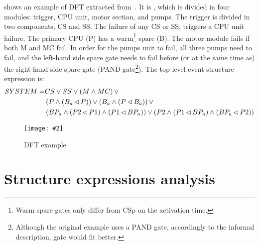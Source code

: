 \documentclass[12pt,openright,twoside,a4paper,oldfontcommands,english,brazil,draft]{abntex2}
\theoremstyle{theo}
\newcommand{\includegraphicsaspectratio}[2][1]{%
  \texttt{[image: \#2]}%
}
\newcommand{\parsin}[1]{\ensuremath\left( #1 \right)}
\def\nibefore{\ensuremath\operatorname{\lhd}}
\begin{document}
\begin{sloppypar}
 shows an example of \ac{DFT} extracted from~\cite{MRL2014}.
It is , which is divided in four modules: trigger, CPU unit, motor section, and pumps.
The trigger is divided in two components, CS and SS.
The failure of any CS or SS, triggers a CPU unit failure.
The primary CPU (P) has a warm\footnote{Warm spare gates only differ from \ac{CSp} on the activation time.} spare (B).
The motor module fails if both M and MC fail.
In order for the pumps unit to fail, all three pumps need to fail, and the left-hand side spare gate needs to fail before (or at the same time as) the right-hand side spare gate (\ac{PAND} gate\footnote{Although the original example uses a \ac{PAND} gate, accordingly to the informal description,  gate would fit better.}).
The top-level event structure expression is:
\begin{align}
SYSTEM =& CS \lor SS \lor \parsin{M \land MC} \lor \\
  &\parsin{P \land \parsin{B_d \nibefore P}} \lor \parsin{B_a \land \parsin{P \nibefore B_a}} \lor \nonumber\\
  &\parsin{BP_a \land \parsin{P2 \nibefore P1} \land \parsin{P1 \nibefore BP_a}} \lor
  \parsin{P2 \land \parsin{P1 \nibefore BP_a} \land \parsin{BP_a \nibefore P2}}\nonumber
\end{align}
\end{sloppypar}

\begin{figure}[t]
  \centering
  \includegraphicsaspectratio[0.65]{dft-example-mrl2014}
  \caption{\Ac{DFT} example}
  \label{fig:dft-example}
\end{figure}

\section{Structure expressions analysis}
\label{sec:structure-expressions-analysis}
\end{document}
